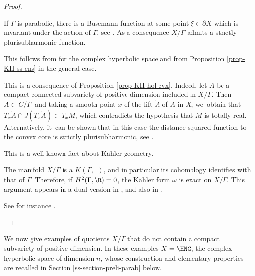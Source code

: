 \skpt
\begin{proof}
\begin{enumeratea}
\item If $\Gamma$ is parabolic, there is a Busemann function at some point $\xi\in \partial X$ which is invariant under the action of $\Gamma$, see \cite[Prop.\,7.8]{eberleinVisibilityManifolds1973}. As a consequence $X/\Gamma$ admits a strictly plurisubharmonic function.
\item This follows from \cite{deyNoteComplexhyperbolicKleinian2020} for the complex hyperbolic space and from Proposition \ref{prop-KH-ss-ens} in the general case.
\item This is a consequence of Proposition \ref{prop-KH-hol-cvx}. Indeed, let $A$ be a compact connected subvariety of positive dimension included in $X/\Gamma$. Then $A\subset C/\Gamma$, and taking a smooth point $x$ of the lift $\tilde{A}$ of $A$ in $X$, we~obtain that $T_x\tilde{A}\cap J(T_x\tilde{A}) \subset T_xM$, which contradicts the hypothesis that $M$ is totally real. Alternatively, it~can be shown that in this case the distance squared function to the convex core is strictly plurisubharmonic, see \cite{chenDiscreteGroupsHolomorphic2013}.
\item This is a well known fact about Kähler geometry.
\item The manifold $X/\Gamma$ is a $K(\Gamma,1)$, and in particular its cohomology identifies with that of $\Gamma$. Therefore, if $H^{2}(\Gamma,\R)=0$, the Kähler form $\omega$ is exact on $X/\Gamma$. This argument appears in a dual version in \cite[Lem.\,4.2]{miebachSchottkyGroupActions2018}, and also in \cite[p.\,27]{kapovichSurveyComplexHyperbolic2022}.
\item See for instance \cite[Proof of Th.\,1.5]{connellNaturalFlowCritical2023}.\qedhere
\end{enumeratea}
\end{proof}
We now give examples of quotients $X/\Gamma$ that do not contain a compact subvariety of positive dimension. In these examples $X=\HNC$, the complex hyperbolic space of dimension $n$, whose construction and elementary properties are recalled in Section \ref{ss-section-preli-parab} below.

